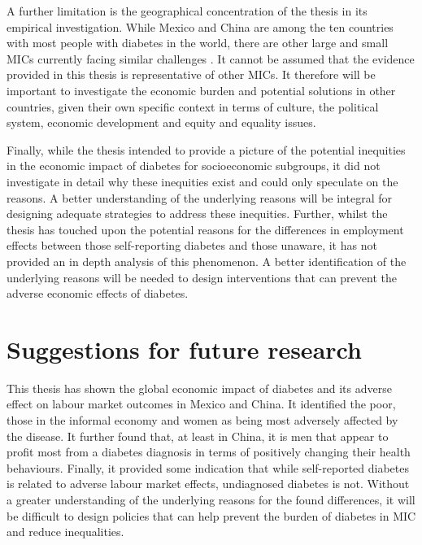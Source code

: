 A further limitation is the geographical concentration of the thesis in its empirical investigation. While Mexico and China are among the ten countries with most people with diabetes in the world, there are other large and small \acp{MIC} currently facing similar challenges \parencite{Risk2016}.  It cannot be assumed that the evidence provided in this thesis is representative of other \acp{MIC}. It therefore will be important to investigate the economic burden and potential solutions in other countries, given their own specific context in terms of culture, the political system, economic development and equity and equality issues.

Finally, while the thesis intended to provide a picture of the potential inequities in the economic impact of diabetes for socioeconomic subgroups, it did not investigate in detail why these inequities exist and could only speculate on the reasons. A better understanding of the underlying reasons will be integral for designing adequate strategies to address these inequities. Further, whilst the thesis has touched upon the potential reasons for the differences in employment effects between those self-reporting diabetes and those unaware, it has not provided an in depth analysis of this phenomenon. A better identification of the underlying reasons will be needed to design interventions that can prevent the adverse economic effects of diabetes. 



\section{Suggestions for future research}

This thesis has shown the global economic impact of diabetes and its adverse effect on labour market outcomes in Mexico and China. It identified the poor, those in the informal economy and women as being most adversely affected by the disease. It further found that, at least in China, it is men that appear to profit most from a diabetes diagnosis in terms of positively changing their health behaviours. Finally, it provided some indication that while self-reported diabetes is related to adverse labour market effects, undiagnosed diabetes is not. Without a greater understanding of the underlying reasons for the found differences, it will be difficult to design policies that can help prevent the burden of diabetes in \ac{MIC} and reduce inequalities.

